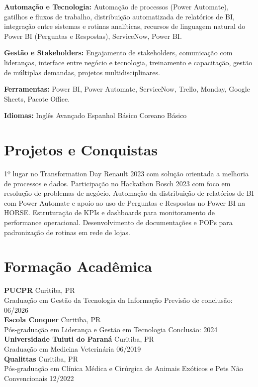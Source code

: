 \documentclass[11pt,a4paper]{article}
\begin{document}
\textbf{Automação e Tecnologia:} Automação de processos (Power Automate), gatilhos e fluxos de trabalho, distribuição automatizada de relatórios de BI, integração entre sistemas e rotinas analíticas, recursos de linguagem natural do Power BI (Perguntas e Respostas), ServiceNow, Power BI.

\textbf{Gestão e Stakeholders:} Engajamento de stakeholders, comunicação com lideranças, interface entre negócio e tecnologia, treinamento e capacitação, gestão de múltiplas demandas, projetos multidisciplinares.

\textbf{Ferramentas:} Power BI, Power Automate, ServiceNow, Trello, Monday, Google Sheets, Pacote Office.

\textbf{Idiomas:} Inglês Avançado \enspace\textbullet\enspace Espanhol Básico \enspace\textbullet\enspace Coreano Básico

\section{Projetos e Conquistas}

1º lugar no Transformation Day Renault 2023 com solução orientada a melhoria de processos e dados. Participação no Hackathon Bosch 2023 com foco em resolução de problemas de negócio. Automação da distribuição de relatórios de BI com Power Automate e apoio ao uso de Perguntas e Respostas no Power BI na HORSE. Estruturação de KPIs e dashboards para monitoramento de performance operacional. Desenvolvimento de documentações e POPs para padronização de rotinas em rede de lojas.

\section{Formação Acadêmica}

\textbf{PUCPR} \hfill Curitiba, PR\\
Graduação em Gestão da Tecnologia da Informação \hfill Previsão de conclusão: 06/2026\\[6pt]

\textbf{Escola Conquer} \hfill Curitiba, PR\\
Pós-graduação em Liderança e Gestão em Tecnologia \hfill Conclusão: 2024\\[6pt]

\textbf{Universidade Tuiuti do Paraná} \hfill Curitiba, PR\\
Graduação em Medicina Veterinária \hfill 06/2019\\[6pt]

\textbf{Qualittas} \hfill Curitiba, PR\\
Pós-graduação em Clínica Médica e Cirúrgica de Animais Exóticos e Pets Não Convencionais \hfill 12/2022
\end{document}
